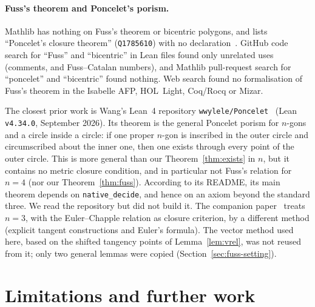 \documentclass[11pt]{article}
\theoremstyle{definition}
\theoremstyle{remark}
\newcommand{\code}[1]{\texttt{#1}}
\begin{document}
\paragraph{Fuss's theorem and Poncelet's porism.}
Mathlib has nothing on Fuss's theorem or bicentric polygons, and  lists
``Poncelet's closure theorem'' (\texttt{Q1785610}) with no declaration~\cite{Mathlib1000}. GitHub code
search for ``Fuss'' and ``bicentric'' in Lean files found only unrelated uses (comments, and
Fuss--Catalan numbers), and Mathlib pull-request search for ``poncelet'' and ``bicentric'' found
nothing. Web search found no formalisation of Fuss's theorem in the Isabelle AFP, HOL~Light, Coq/Rocq
or Mizar.

The closest prior work is Wang's Lean~4 repository \texttt{wwylele/Poncelet}~\cite{WangPoncelet}
(Lean \texttt{v4.34.0}, September 2026). Its theorem  is the general
Poncelet porism for $n$-gons and a circle inside a circle: if one proper $n$-gon is inscribed in the
outer circle and circumscribed about the inner one, then one exists through every point of the outer
circle. This is more general than our Theorem~\ref{thm:exists} in $n$, but it contains no metric
closure condition, and in particular not Fuss's relation for $n=4$ (nor our
Theorem~\ref{thm:fuss}). According to its README, its main theorem depends on
\code{native\_decide}, and hence on an axiom beyond the standard three. We read the repository but did
not build it. The companion paper~\cite{BaldTriangles} treats $n=3$, with the Euler--Chapple relation
as closure criterion, by a different method (explicit tangent constructions and Euler's formula). The
vector method used here, based on the shifted tangency points of Lemma~\ref{lem:vrel}, was not reused
from it; only two general lemmas were copied (Section~\ref{sec:fuss-setting}).

\section{Limitations and further work}\label{sec:limits}
\end{document}
